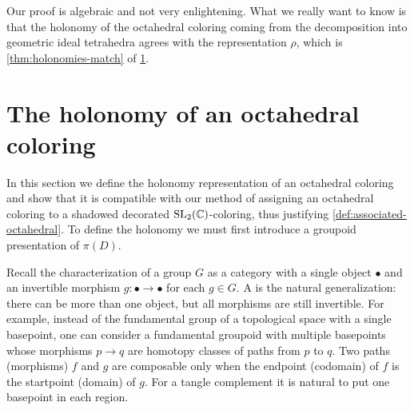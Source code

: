 \documentclass[leqno]{sl2art}
\begin{document}
Our proof is algebraic and not very enlightening.
What we really want to know is that the holonomy of the octahedral coloring coming from the decomposition into geometric ideal tetrahedra agrees with the representation \(\rho\), which is \cref{thm:holonomies-match} of \cref{sec:holonomy}.

\section{The holonomy of an octahedral coloring}
\label{sec:holonomy}

In this section we define the holonomy representation of an octahedral coloring and show that it is compatible with our method of assigning an octahedral coloring to a shadowed decorated \(\operatorname{SL}_2(\mathbb{C})\)-coloring, thus justifying \cref{def:associated-octahedral}.
To define the holonomy we must first introduce a groupoid presentation of \(\pi(D)\).

Recall the characterization of a group \(G\) as a category with a single object \(\bullet\) and an invertible morphism \(g : \bullet \to \bullet\) for each \(g \in G\).
A  is the natural generalization: there can be more than one object, but all morphisms are still invertible.
For example, instead of the fundamental group of a topological space with a single basepoint, one can consider a fundamental groupoid with multiple basepoints whose morphisms \(p \to q\) are homotopy classes of paths from \(p\) to \(q\).
Two paths (morphisms) \(f\) and \(g\) are composable only when the endpoint (codomain) of \(f\) is the startpoint (domain) of \(g\).
For a tangle complement it is natural to put one basepoint in each region.

\begin{marginfigure}
  
  \caption{Generators of the fundamental groupoid \(\gpoid{D}\) of a tangle diagram.}
  \label{fig:tangle-groupoid-generators}
\end{marginfigure}
\end{document}
